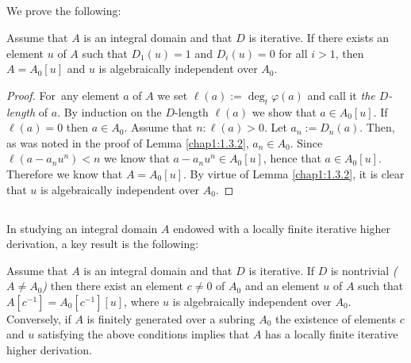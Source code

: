\subsection{}\label{chap1:1.4}
We prove the following:

\begin{lemma*}
  Assume that $A$ is an integral domain and that $D$ is iterative. If
  there exists an element $u$ of $A$ such that $D_{1}(u)=1$ and
  $D_{i}(u)=0$ for all $i>1$, then $A=A_{0}[u]$ and $u$ is algebraically
  independent over $A_{0}$.
\end{lemma*}

\begin{proof}
  For\pageoriginale\ any element $a$ of $A$ we set
  $\ell(a):=\deg_{t}\varphi(a)$ and call it {\em the $D$-length} of
  $a$. By induction on the $D$-length $\ell(a)$ we show that $a\in
  A_{0}[u]$. If $\ell(a)=0$ then $a\in A_{0}$. Assume that
  $n:\ell(a)>0$. Let $a_{n}:=D_{n}(a)$. Then, as was noted in the proof
  of Lemma \ref{chap1:1.3.2}, $a_{n}\in A_{0}$. Since
  $\ell(a-a_{n}u^{n})<n$ we know that $a-a_{n}u^{n}\in A_{0}[u]$, hence
  that $a\in A_{0}[u]$. Therefore we know that $A=A_{0}[u]$. By virtue
  of Lemma \ref{chap1:1.3.2}, it is clear that $u$ is algebraically
  independent over $A_{0}$.
\end{proof}

\subsection{}\label{chap1:1.5}
In studying an integral domain $A$ endowed with a locally finite
iterative higher derivation, a key result is the following:

\begin{lemma*}
Assume that $A$ is an integral domain and that $D$ is iterative. If
$D$ is nontrivial {\em (\iec $A\neq A_{0}$)} then there exist an
element $c\neq 0$ of $A_{0}$ and an element $u$ of $A$ such that
$A[c^{-1}]=A_{0}[c^{-1}][u]$, where $u$ is algebraically independent
over $A_{0}$. Conversely, if $A$ is finitely generated over a subring
$A_{0}$ the existence of elements $c$ and $u$ satisfying the above
conditions implies that $A$ has a locally finite iterative higher
derivation. 
\end{lemma*}

